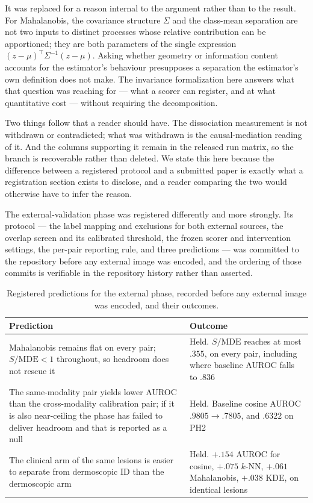 \documentclass[11pt,a4paper]{article}
\begin{document}
It was replaced for a reason internal to the argument rather than to the
result. For Mahalanobis, the covariance structure $\Sigma$ and the class-mean
separation are not two inputs to distinct processes whose relative contribution
can be apportioned; they are both parameters of the single expression
$(z-\mu)^\top\Sigma^{-1}(z-\mu)$. Asking whether geometry or information content
accounts for the estimator's behaviour presupposes a separation the estimator's
own definition does not make. The invariance formalization here answers what
that question was reaching for --- what a scorer can register, and at what
quantitative cost --- without requiring the decomposition.

Two things follow that a reader should have. The dissociation measurement is
not withdrawn or contradicted; what was withdrawn is the causal-mediation
reading of it. And the columns supporting it remain in the released run matrix,
so the branch is recoverable rather than deleted. We state this here because
the difference between a registered protocol and a submitted paper is exactly
what a registration section exists to disclose, and a reader comparing the two
would otherwise have to infer the reason.

The external-validation phase was registered differently and more strongly. Its
protocol --- the label mapping and exclusions for both external sources, the
overlap screen and its calibrated threshold, the frozen scorer and intervention
settings, the per-pair reporting rule, and three predictions --- was committed
to the repository before any external image was encoded, and the ordering of
those commits is verifiable in the repository history rather than asserted.

\begin{table}[t]
\centering
\caption{Registered predictions for the external phase, recorded before any external image was encoded, and their outcomes.}
\label{tab:prereg}
\small
\begin{tabular}{p{5.4cm}p{7.4cm}}
\toprule
Prediction & Outcome\\
\midrule
Mahalanobis remains flat on every pair; $S/\mathrm{MDE}<1$ throughout, so headroom does not rescue it &
Held. $S/\mathrm{MDE}$ reaches at most $.355$, on every pair, including where baseline AUROC falls to $.836$\\
\addlinespace
The same-modality pair yields lower AUROC than the cross-modality calibration pair; if it is also near-ceiling the phase has failed to deliver headroom and that is reported as a null &
Held. Baseline cosine AUROC $.9805\rightarrow.7805$, and $.6322$ on PH2\\
\addlinespace
The clinical arm of the same lesions is easier to separate from dermoscopic ID than the dermoscopic arm &
Held. $+.154$ AUROC for cosine, $+.075$ $k$-NN, $+.061$ Mahalanobis, $+.038$ KDE, on identical lesions\\
\bottomrule
\end{tabular}
\end{table}
\end{document}
